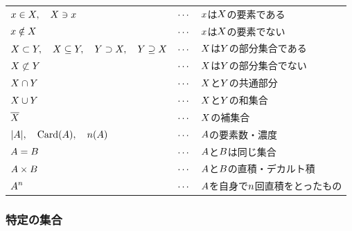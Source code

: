 \documentclass[a4j, 9pt]{ltjsarticle}
\begin{document}
      \begin{center}
        \begin{tablehere}
          \centering
          \begin{tabular}{lcl}
              
              $\displaystyle x \in X, \quad X \ni x$                                                    & $\displaystyle \cdots$  & $\displaystyle x$は$\displaystyle X$の要素である\\
              $\displaystyle x \notin X$                                                                & $\displaystyle \cdots$  & $\displaystyle x$は$\displaystyle X$の要素でない\\
              $\displaystyle X \subset Y, \quad X \subseteq Y, \quad Y \supset X, \quad Y \supseteq X$  & $\displaystyle \cdots$  & $\displaystyle X$は$\displaystyle Y$の部分集合である\\
              $\displaystyle X \not\subset Y$                                                           & $\displaystyle \cdots$  & $\displaystyle X$は$\displaystyle Y$の部分集合でない\\
              $\displaystyle X \cap Y$                                                                  & $\displaystyle \cdots$  & $\displaystyle X$と$\displaystyle Y$の共通部分\\
              $\displaystyle X \cup Y$                                                                  & $\displaystyle \cdots$  & $\displaystyle X$と$\displaystyle Y$の和集合\\
              $\displaystyle \overline{X}$                                                              & $\displaystyle \cdots$  & $\displaystyle X$の補集合\\
              $\displaystyle | A |, \quad \operatorname{Card}(A), \quad n(A)$                           & $\displaystyle \cdots$  & $\displaystyle A$の要素数・濃度\\
              $\displaystyle A = B$                                                                     & $\displaystyle \cdots$  & $\displaystyle A$と$\displaystyle B$は同じ集合\\
              $\displaystyle A \times B$                                                                & $\displaystyle \cdots$  & $\displaystyle A$と$\displaystyle B$の直積・デカルト積\\
              $\displaystyle A^n$                                                                       & $\displaystyle \cdots$  & $\displaystyle A$を自身で$\displaystyle n$回直積をとったもの\\

          \end{tabular}
        \end{tablehere}
      \end{center}

      \subsubsection{特定の集合}
\end{document}
